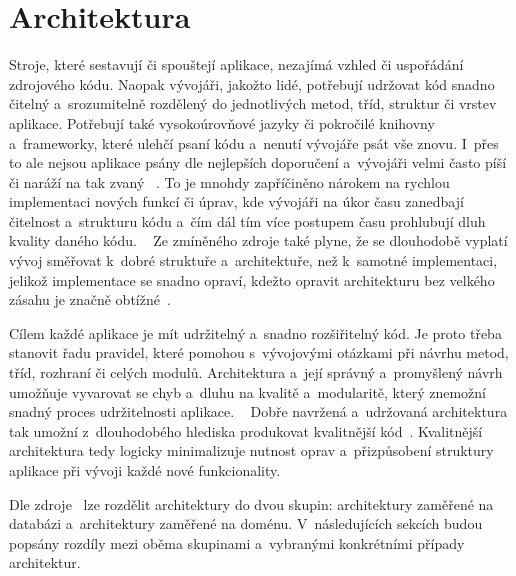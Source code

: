 \section{Architektura}

Stroje,
které sestavují či spouštejí aplikace,
nezajímá vzhled či uspořádání zdrojového kódu.
Naopak vývojáři,
jakožto lidé,
potřebují udržovat kód snadno čitelný a~srozumitelně rozdělený do jednotlivých
metod, tříd, struktur či vrstev aplikace.
Potřebují také vysokoúrovňové jazyky či pokročilé knihovny a~frameworky,
které ulehčí psaní kódu a~nenutí vývojáře psát vše znovu.
I~přes to ale nejsou aplikace psány dle nejlepších doporučení
a~vývojáři velmi často píší či naráží na tak zvaný ~\cite{architecture}.
To je mnohdy zapříčiněno nárokem na rychlou implementaci nových funkcí či úprav,
kde vývojáři na úkor času zanedbají čitelnost a~strukturu kódu
a~čím dál tím více postupem času prohlubují dluh kvality daného kódu.
\emph{}~\cite[str.~140]{martin_clean_architecture}
Ze zmíněného zdroje také plyne,
že se dlouhodobě vyplatí vývoj směřovat k~dobré struktuře a~architektuře,
než k~samotné implementaci,
jelikož implementace se snadno opraví,
kdežto opravit architekturu bez velkého zásahu
je značně obtížné~\cite[str.~135--146]{martin_clean_architecture}.

Cílem každé aplikace je mít udržitelný a~snadno rozšiřitelný kód.
Je proto třeba stanovit řadu pravidel,
které pomohou s~vývojovými otázkami při návrhu metod, tříd, rozhraní či
celých modulů.
Architektura a~její správný a~\mbox{promyšlený} návrh umožňuje vyvarovat
se chyb a~dluhu na kvalitě a~modularitě,
který znemožní snadný proces udržitelnosti aplikace.
\emph{}~\cite[str.~137]{martin_clean_architecture}
Dobře navržená a~udržovaná architektura tak umožní z~dlouhodobého hlediska
produkovat kvalitnější kód~\cite[str.~135--146]{martin_clean_architecture}.
Kvalitnější architektura tedy logicky minimalizuje nutnost oprav
a~přizpůsobení struktury aplikace při vývoji každé nové funkcionality.

Dle zdroje~\cite{architecture} lze rozdělit architektury do dvou skupin:
architektury zaměřené na databázi a~architektury zaměřené na doménu.
V~následujících sekcích budou popsány rozdíly mezi oběma skupinami
a~vybranými konkrétními případy architektur.

